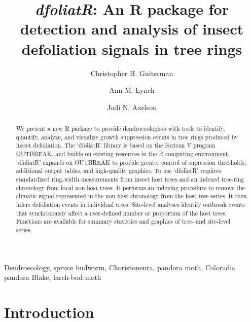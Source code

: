\documentclass[review]{elsarticle} %
\begin{document}
\begin{frontmatter}

  \title{\emph{dfoliatR}: An R package for detection and analysis of insect
defoliation signals in tree rings}
    \author[a,b]{Christopher H. Guiterman}
    \author[a,c]{Ann M. Lynch}
    \author[c]{Jodi N. Axelson}
      \address[a]{Laboratory of Tree-Ring Research, University of Arizona, 1215 E Lowell
St.~Box 210045, Tucson, AZ, 85721}
    \address[b]{Three Pines Forest Research, LLC, PO Box 225, Etna, NH, 03750}
    \address[c]{U.S. Forest Service, Rocky Mountain Research Station, 1215 E Lowell
St.~Box 210045, Tucson, AZ, 85721}
    \address[d]{Dept of Environmental Science, Policy \& Management, University of
California, Berkeley, Berkeley, CA 94720}
  
  \begin{abstract}
  We present a new R package to provide dendroecologists with tools to
  identify, quantify, analyze, and visualize growth suppression events in
  tree rings produced by insect defoliation. The `dfoliatR' library is
  based on the Fortran V program OUTBREAK, and builds on existing
  resources in the R computing environment. `dfoliatR' expands on OUTBREAK
  to provide greater control of supression thresholds, additional output
  tables, and high-quality graphics. To use `dfoliatR' requires
  standardized ring-width measurements from insect host trees and an
  indexed tree-ring chronology from local non-host trees. It performs an
  indexing procedure to remove the climatic signal represented in the
  non-host chronology from the host-tree series. It then infers
  defoliation events in individual trees. Site-level analyses identify
  outbreak events that synchronously affect a user-defined number or
  proportion of the host trees. Functions are available for summary
  statistics and graphics of tree- and site-level series.
  
  \hfill\break
  \end{abstract}
   \begin{keyword} Dendroecology, spruce budworm, Choristoneura, pandora moth, Coloradia
pandora Blake, larch-bud-moth \newpage\end{keyword}
 \end{frontmatter}

\hypertarget{introduction}{%
\section{Introduction}\label{introduction}}
\end{document}
